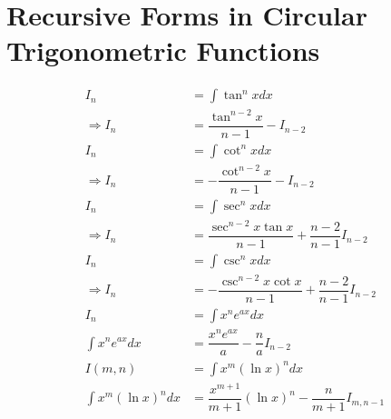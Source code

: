 \documentclass[../main.tex]{subfile}
\begin{document}
        \section{Recursive Forms in Circular Trigonometric Functions}
        \begin{align}
            I_n & = \int \tan^n x dx\nonumber\\
            \Rightarrow I_n & = \dfrac{\tan^{n - 2} x}{n - 1} - I_{n-2}\\
            \hline
            I_n & = \int \cot^n x dx \nonumber\\
            \Rightarrow I_n & = - \dfrac{\cot^{n - 2} x}{n - 1} - I_{n - 2}\\
            \hline
            I_n & = \int \sec^n x dx \nonumber\\
            \Rightarrow I_n & = \dfrac{\sec^{n - 2} x \tan x}{n - 1} + \dfrac{n - 2}{n - 1} I_{n-2}\\
            \hline
            I_n & = \int \csc^n x dx \nonumber\\
            \Rightarrow I_n & = -\dfrac{ \csc^{n - 2} x \cot x }{ n - 1 } + \dfrac{ n - 2 }{ n - 1 } I_{ n - 2 }\\
            \hline
            I_n & = \int x^n e^{ax} dx\\
            \int x^n e^{ax} dx & = \dfrac{x^n e^{ax}}{a} - \dfrac{n}{a} I_{n-2}\\
            \hline
            I(m,n) & = \int x^m (\ln x)^n dx\\
            \int x^m (\ln x)^n dx & = \dfrac{x^{m + 1}}{m + 1}(\ln x)^n - \dfrac{n}{m + 1} I_{m,n-1}
        \end{align}
\end{document}
